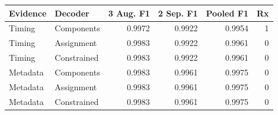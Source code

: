 \begin{tabular*}{\linewidth}{@{\extracolsep{\fill}}llrrrr@{}}\toprule
Evidence & Decoder & 3 Aug. F1 & 2 Sep. F1 & Pooled F1 & Rx \\\midrule
Timing & Components & 0.9972 & 0.9922 & 0.9954 & 1 \\
Timing & Assignment & 0.9983 & 0.9922 & 0.9961 & 0 \\
Timing & Constrained & 0.9983 & 0.9922 & 0.9961 & 0 \\
Metadata & Components & 0.9983 & 0.9961 & 0.9975 & 0 \\
Metadata & Assignment & 0.9983 & 0.9961 & 0.9975 & 0 \\
Metadata & Constrained & 0.9983 & 0.9961 & 0.9975 & 0 \\
\bottomrule\end{tabular*}
